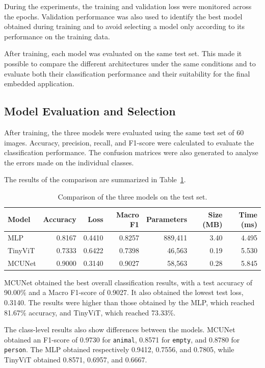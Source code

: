\documentclass{article}
\begin{document}
During the experiments, the training and validation loss were monitored
across the epochs. Validation performance was also used to identify the
best model obtained during training and to avoid selecting a model only
according to its performance on the training data.

After training, each model was evaluated on the same test set. This made it
possible to compare the different architectures under the same conditions
and to evaluate both their classification performance and their suitability
for the final embedded application.

\subsection{Model Evaluation and Selection}
\label{subsec:model-evaluation}

After training, the three models were evaluated using the same test set of
60 images. Accuracy, precision, recall, and F1-score were calculated to
evaluate the classification performance. The confusion matrices were also
generated to analyse the errors made on the individual classes.

The results of the comparison are summarized in
Table~\ref{tab:model-comparison}.

\begin{table}[htbp]
\centering
\caption{Comparison of the three models on the test set.}
\label{tab:model-comparison}
\begin{tabular}{lrrrrrr}
\hline
\textbf{Model} &
\textbf{Accuracy} &
\textbf{Loss} &
\textbf{Macro F1} &
\textbf{Parameters} &
\textbf{Size (MB)} &
\textbf{Time (ms)} \\
\hline
MLP     & 0.8167 & 0.4410 & 0.8257 & 889,411 & 3.40 & 4.495 \\
TinyViT & 0.7333 & 0.6422 & 0.7398 & 46,563  & 0.19 & 5.530 \\
MCUNet  & 0.9000 & 0.3140 & 0.9027 & 58,563  & 0.28 & 5.845 \\
\hline
\end{tabular}
\end{table}

MCUNet obtained the best overall classification results, with a test
accuracy of 90.00\% and a Macro F1-score of 0.9027. It also obtained the
lowest test loss, 0.3140. The results were higher than those obtained by
the MLP, which reached 81.67\% accuracy, and TinyViT, which reached
73.33\%.

The class-level results also show differences between the models. MCUNet
obtained an F1-score of 0.9730 for \texttt{animal}, 0.8571 for
\texttt{empty}, and 0.8780 for \texttt{person}. The MLP obtained
respectively 0.9412, 0.7556, and 0.7805, while TinyViT obtained 0.8571,
0.6957, and 0.6667.
\end{document}
